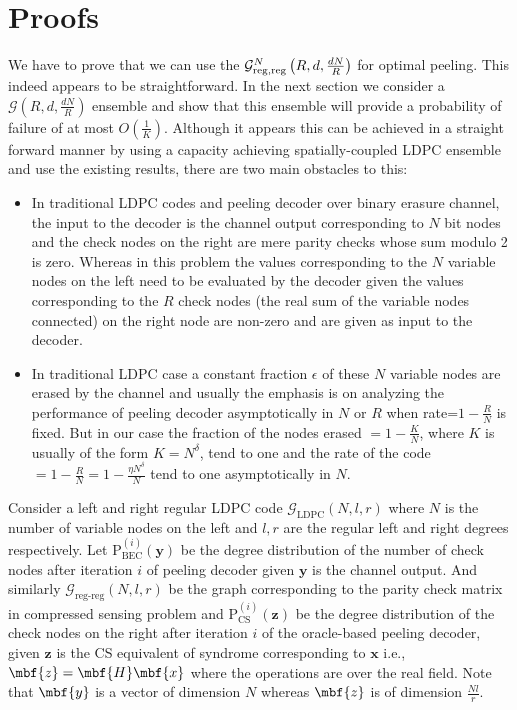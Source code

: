 \documentclass[conference]{IEEEtran}
\begin{document}
\section{Proofs}
We have to prove that we can use the $\mathcal{G}^N_{\rm reg,reg}\left(R,d, \frac{dN}{R} \right)$ for optimal peeling. This indeed appears to be straightforward.
In the next section we consider a $\mathcal{G}(R,d,\frac{dN}{R})$ ensemble and show that this ensemble will provide a probability of failure of at most $O\left(\frac{1}{K}\right)$. Although it appears this can be achieved in a straight forward manner by using a capacity achieving spatially-coupled LDPC ensemble and use the existing results, there are two main obstacles to this:
\begin{itemize}
\item  In traditional LDPC codes and peeling decoder over binary erasure channel, the input to the decoder is the channel output corresponding to $N$ bit nodes and the check nodes on the right are mere parity checks whose sum modulo 2 is zero. Whereas in this problem the values corresponding to the $N$ variable nodes on the left need to be evaluated by the decoder given the values corresponding to the $R$ check nodes (the real sum of the variable nodes connected) on the right node are non-zero  and are given as input to the decoder.\\
\item  In traditional LDPC case a constant fraction $\epsilon$ of these $N$ variable nodes are erased by the channel and usually the emphasis is on analyzing the performance of peeling decoder asymptotically in $N$ or $R$ when rate=$1-\frac{R}{N}$ is fixed. But in our case the fraction of the nodes erased $=1-\frac{K}{N}$, where $K$ is usually of the form $K=N^{\delta}$, tend to one and the rate of the code$=1-\frac{R}{N}=1-\frac{\eta N^{\delta}}{N}$ tend to one asymptotically in $N$.
\end{itemize}
\vspace{1ex}

Consider a left and right regular LDPC code $\mathcal{G}_{\text{LDPC}}(N,l,r)$ where $N$ is the number of variable nodes on the left and $l,r$ are the regular left and right degrees respectively. Let $\text{P}_{\text{BEC}}^{(i)}(\mathbf{y})$ be the degree distribution of the number of check nodes after iteration $i$ of peeling decoder given $\mathbf{y}$ is the channel output. And similarly $\mathcal{G}_{\text{reg-reg}}(N,l,r)$ be the graph corresponding to the parity check matrix in compressed sensing problem and $\text{P}_{\text{CS}}^{(i)}(\mathbf{z})$ be the degree distribution of the check nodes on the right after iteration $i$ of the oracle-based peeling decoder, given $\mathbf{z}$ is the CS equivalent of syndrome corresponding to $\mathbf{x}$ i.e., $\mbf{z}=\mbf{H}\mbf{x}$ where the operations are over the real field. Note that $\mbf{y}$ is a vector of dimension $N$ whereas $\mbf{z}$ is of dimension $\frac{Nl}{r}$.\\
\end{document}
